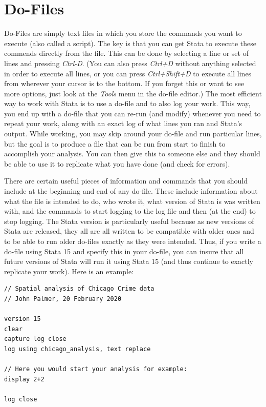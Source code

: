 \documentclass[]{book}
\begin{document}
\hypertarget{do-files}{%
\section{Do-Files}\label{do-files}}

Do-Files are simply text files in which you store the commands you want to execute (also called a script). The key is that you can get Stata to execute these commends directly from the file. This can be done by selecting a line or set of lines and pressing \emph{Ctrl-D}. (You can also press \emph{Ctrl+D} without anything selected in order to execute all lines, or you can press \emph{Ctrl+Shift+D} to execute all lines from wherever your cursor is to the bottom. If you forget this or want to see more options, just look at the \emph{Tools} menu in the do-file editor.) The most efficient way to work with Stata is to use a do-file and to also log your work. This way, you end up with a do-file that you can re-run (and modify) whenever you need to repeat your work, along with an exact log of what lines you ran and Stata's output. While working, you may skip around your do-file and run particular lines, but the goal is to produce a file that can be run from start to finish to accomplish your analysis. You can then give this to someone else and they should be able to use it to replicate what you have done (and check for errors).

There are certain useful pieces of information and commands that you should include at the beginning and end of any do-file. These include information about what the file is intended to do, who wrote it, what version of Stata is was written with, and the commands to start logging to the log file and then (at the end) to stop logging. The Stata version is particularly useful because as new versions of Stata are released, they all are all written to be compatible with older ones and to be able to run older do-files exactly as they were intended. Thus, if you write a do-file using Stata 15 and specify this in your do-file, you can insure that all future versions of Stata will run it using Stata 15 (and thus continue to exactly replicate your work). Here is an example:

\begin{verbatim}
// Spatial analysis of Chicago Crime data
// John Palmer, 20 February 2020

version 15
clear
capture log close
log using chicago_analysis, text replace

// Here you would start your analysis for example:
display 2+2

log close
\end{verbatim}
\end{document}
